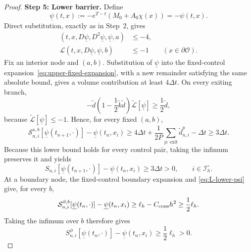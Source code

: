 \documentclass[11pt]{article}
\theoremstyle{definition}
\theoremstyle{remark}
\newcommand{\cO}{\mathcal{O}}
\newcommand{\cS}{\mathcal{S}}
\begin{document}
\begin{proof}
		\medskip
		\noindent\textbf{Step 5: Lower barrier.}
		Define
		\[
		\underline\psi(t,x):=-e^{T-t}(M_0+A_0\chi(x))=-\psi(t,x).
		\]
		Direct substitution, exactly as in Step~2, gives
		\begin{align}
			[-\partial_t\underline\psi+\mathcal H]
			(t,x,D\underline\psi,D^2\underline\psi,\underline\psi,a)&\le-4,
			\label{eq:H-lower-psi}\\
			\mathcal L(t,x,D\underline\psi,\underline\psi,b)&\le-1
			\qquad(x\in\partial\cO).
			\label{eq:L-lower-psi}
		\end{align}
		Fix an interior node and $(a,b)$.  Substitution of $\underline\psi$ into
		the fixed-control expansion~\eqref{eq:upper-fixed-expansion}, with a new
		remainder satisfying the same absolute bound, gives a volume contribution
		at least $4\Delta t$.  On every exiting branch,
		\[
		-\widetilde d\left(1-\frac12\widetilde k\widetilde d\right)
		\widetilde{\mathcal L}[\underline\psi]
		\ge\frac12\widetilde d,
		\]
		because $\widetilde{\mathcal L}[\underline\psi]\le-1$.  Hence, for every
		fixed $(a,b)$,
		\[
		\cS_{n,i}^{a,b}[\underline\psi(t_{n+1},\cdot)]
		-\underline\psi(t_n,x_i)
		\ge4\Delta t+\frac1{2P}\sum_{p:\,\mathrm{exit}}
		\widetilde d_{n,i}^p-\Delta t
		\ge3\Delta t.
		\]
		Because this lower bound holds for every control pair, taking the infimum
		preserves it and yields
		\begin{equation}
			S_{n,i}[\underline\psi(t_{n+1},\cdot)]
			-\underline\psi(t_n,x_i)\ge3\Delta t>0,
			\qquad i\in\mathcal I_h^\circ.
			\label{eq:S-lower-psi-interior}
		\end{equation}
		At a boundary node, the fixed-control boundary expansion and
		\eqref{eq:L-lower-psi} give, for every $b$,
		\[
		\cS_{n,i}^{\partial,b}[\underline\psi(t_n,\cdot)]
		-\underline\psi(t_n,x_i)
		\ge\ell_h-C_{\rm cons}h^2\ge\frac12\ell_h.
		\]
		Taking the infimum over $b$ therefore gives
		\begin{equation}
			S_{n,i}^{\partial}[\underline\psi(t_n,\cdot)]
			-\underline\psi(t_n,x_i)
			\ge\frac12\ell_h>0.
			\label{eq:S-lower-psi-boundary}
		\end{equation}
		

\end{proof}
\end{document}
